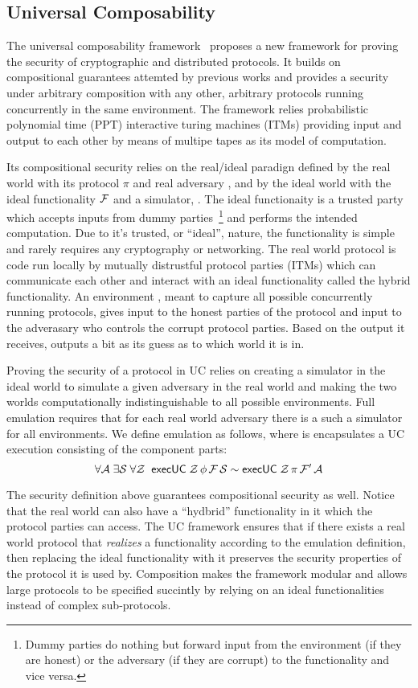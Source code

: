 \subsection{Universal Composability}
The universal composability framework~\cite{uc} proposes a new framework for proving the security of cryptographic and distributed protocols.
It builds on compositional guarantees attemted by previous works and provides a security under arbitrary composition with any other, arbitrary protocols running concurrently in the same environment.
The framework relies probabilistic polynomial time (PPT) interactive turing machines (ITMs) providing input and output to each other by means of multipe tapes as its model of computation. 

Its compositional security relies on the real/ideal paradign defined by the real world with its protocol $\pi$ and real adversary \A, and by the ideal world with the ideal functionality $\mathcal{F}$ and a simulator, \Sim.
The ideal functionaity is a trusted party which accepts inputs from dummy parties~\footnote{Dummy parties do nothing but forward input from the environment (if they are honest) or the adversary (if they are corrupt) to the functionality and vice versa.} and performs the intended computation. Due to it's trusted, or ``ideal'', nature, the functionality is simple and rarely requires any cryptography or networking. 
The real world protocol is code run locally by mutually distrustful protocol parties (ITMs) which can communicate each other and interact with an ideal functionality called the hybrid functionality.
An environment \Z, meant to capture all possible concurrently running protocols, gives input to the honest parties of the protocol and input to the adverasary who controls the corrupt protocol parties. 
Based on the output it receives, \Z outputs a bit as its guess as to which world it is in. 

Proving the security of a protocol in UC relies on creating a simulator in the ideal world to simulate a given adversary in the real world and making the two worlds computationally indistinguishable to all possible environments. 
Full emulation requires that for each real world adversary there is a such a simulator for all environments. We define emulation as follows, where  is encapsulates a UC execution consisting of the component parts:
\[ \forall \mathcal{A} \; \exists \mathcal{S} \; \forall \mathcal{Z} \; \; {\mathsf {execUC}} \; \mathcal{Z} \, \phi \, \mathcal{F} \, \mathcal{S} \sim {\mathsf {execUC}} \; \mathcal{Z} \, \pi \, \mathcal{F}' \, \mathcal{A} \]

The security definition above guarantees compositional security as well.
Notice that the real world can also have a ``hydbrid'' functionality in it which the protocol parties can access.
The UC framework ensures that if there exists a real world protocol that \emph{realizes} a functionality according to the emulation definition, then replacing the ideal functionality with it preserves the security properties of the protocol it is used by. 
Composition makes the framework modular and allows large protocols to be specified succintly by relying on an ideal functionalities instead of complex sub-protocols.

